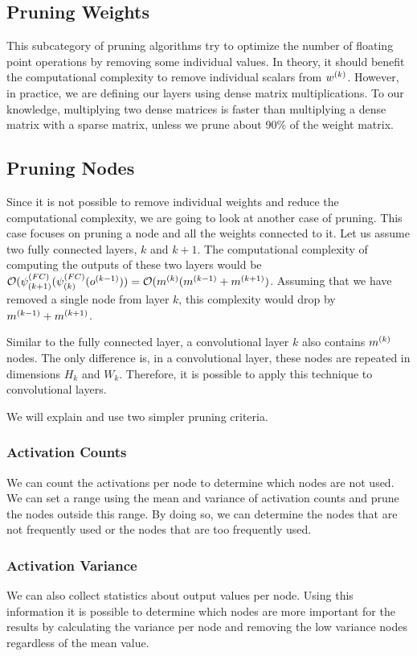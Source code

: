 \subsection{Pruning Weights}
This subcategory of pruning algorithms try to optimize the number of floating point operations by removing some individual values. In theory, it should benefit the computational complexity to remove individual scalars from $w^{(k)}$. However, in practice, we are defining our layers using dense matrix multiplications. To our knowledge, multiplying two dense matrices is faster than multiplying a dense matrix with a sparse matrix, unless we prune about 90\% of the weight matrix. 

\subsection{Pruning Nodes}
Since it is not possible to remove individual weights and reduce the computational complexity, we are going to look at another case of pruning. This case focuses on pruning a node and all the weights connected to it. Let us assume two fully connected layers, $k$ and $k+1$. The computational complexity of computing the outputs of these two layers would be $\mathcal{O}(\psi^{(FC)}_{(k+1)}(\psi^{(FC)}_{(k)}(o^{(k-1)})) = \mathcal{O}(m^{(k)}(m^{(k-1)} + m^{(k+1)})$. Assuming that we have removed a single node from layer $k$, this complexity would drop by $m^{(k-1)} + m^{(k+1)}$. 

Similar to the fully connected layer, a convolutional layer $k$ also contains $m^{(k)}$ nodes. The only difference is, in a convolutional layer, these nodes are repeated in dimensions $H_k$ and $W_k$. Therefore, it is possible to apply this technique to convolutional layers. 

We will explain and use two simpler pruning criteria. 

\subsubsection{Activation Counts}
We can count the activations per node to determine which nodes are not used. We can set a range using the mean and variance of activation counts and prune the nodes outside this range. By doing so, we can determine the nodes that are not frequently used or the nodes that are too frequently used.

\subsubsection{Activation Variance}
We can also collect statistics about output values per node. Using this information it is possible to determine which nodes are more important for the results by calculating the variance per node and removing the low variance nodes regardless of the mean value.

